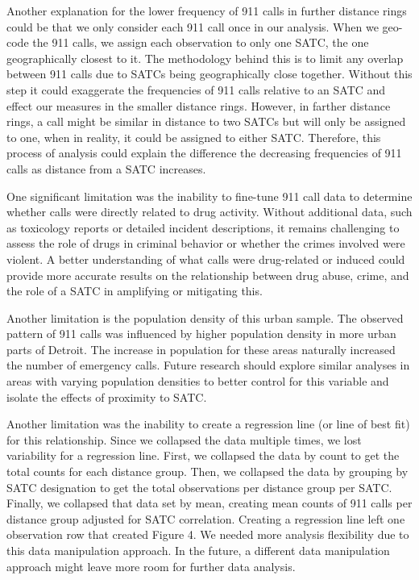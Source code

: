 \documentclass[12pt]{article}
\begin{document}
Another explanation for the lower frequency of 911 calls in further distance rings could be that we only consider each 911 call once in our analysis. When we geo-code the 911 calls, we assign each observation to only one SATC, the one geographically closest to it. The methodology behind this is to limit any overlap between 911 calls due to SATCs being geographically close together. Without this step it could exaggerate the frequencies of 911 calls relative to an SATC and effect our measures in the smaller distance rings.  However, in farther distance rings, a call might be similar in distance to two SATCs but will only be assigned to one, when in reality, it could be assigned to either SATC. Therefore, this process of analysis could explain the difference the decreasing frequencies of 911 calls as distance from a SATC increases.

One significant limitation was the inability to fine-tune 911 call data to determine whether calls were directly related to drug activity. Without additional data, such as toxicology reports or detailed incident descriptions, it remains challenging to assess the role of drugs in criminal behavior or whether the crimes involved were violent. A better understanding of what calls were drug-related or induced could provide more accurate results on the relationship between drug abuse, crime, and the role of a SATC in amplifying or mitigating this. 
    
Another limitation is the population density of this urban sample. The observed pattern of 911 calls was influenced by higher population density in more urban parts of Detroit. The increase in population for these areas naturally increased the number of emergency calls. Future research should explore similar analyses in areas with varying population densities to better control for this variable and isolate the effects of proximity to SATC. 

Another limitation was the inability to create a regression line (or line of best fit) for this relationship. Since we collapsed the data multiple times, we lost variability for a regression line. First, we collapsed the data by count to get the total counts for each distance group. Then, we collapsed the data by grouping by SATC designation to get the total observations per distance group per SATC. Finally, we collapsed that data set by mean, creating mean counts of 911 calls per distance group adjusted for SATC correlation. Creating a regression line left one observation row that created Figure 4. We needed more analysis flexibility due to this data manipulation approach. In the future, a different data manipulation approach might leave more room for further data analysis. 
\end{document}
